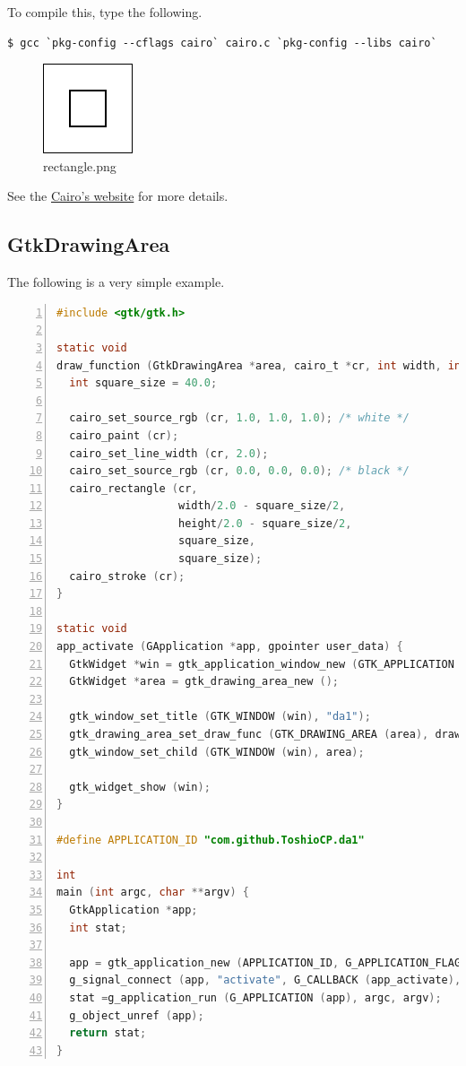 To compile this, type the following.

\begin{lstlisting}
$ gcc `pkg-config --cflags cairo` cairo.c `pkg-config --libs cairo`
\end{lstlisting}

\begin{figure}
\centering
\includegraphics{../image/rectangle.png}
\caption{rectangle.png}
\end{figure}

See the \href{https://www.cairographics.org/}{Cairo's website} for more
details.

\hypertarget{gtkdrawingarea}{%
\subsection{GtkDrawingArea}\label{gtkdrawingarea}}

The following is a very simple example.

\begin{lstlisting}[language=C, numbers=left]
#include <gtk/gtk.h>

static void
draw_function (GtkDrawingArea *area, cairo_t *cr, int width, int height, gpointer user_data) {
  int square_size = 40.0;

  cairo_set_source_rgb (cr, 1.0, 1.0, 1.0); /* white */
  cairo_paint (cr);
  cairo_set_line_width (cr, 2.0);
  cairo_set_source_rgb (cr, 0.0, 0.0, 0.0); /* black */
  cairo_rectangle (cr,
                   width/2.0 - square_size/2,
                   height/2.0 - square_size/2,
                   square_size,
                   square_size);
  cairo_stroke (cr);
}

static void
app_activate (GApplication *app, gpointer user_data) {
  GtkWidget *win = gtk_application_window_new (GTK_APPLICATION (app));
  GtkWidget *area = gtk_drawing_area_new ();

  gtk_window_set_title (GTK_WINDOW (win), "da1");
  gtk_drawing_area_set_draw_func (GTK_DRAWING_AREA (area), draw_function, NULL, NULL);
  gtk_window_set_child (GTK_WINDOW (win), area);

  gtk_widget_show (win);
}

#define APPLICATION_ID "com.github.ToshioCP.da1"

int
main (int argc, char **argv) {
  GtkApplication *app;
  int stat;

  app = gtk_application_new (APPLICATION_ID, G_APPLICATION_FLAGS_NONE);
  g_signal_connect (app, "activate", G_CALLBACK (app_activate), NULL);
  stat =g_application_run (G_APPLICATION (app), argc, argv);
  g_object_unref (app);
  return stat;
}
\end{lstlisting}

